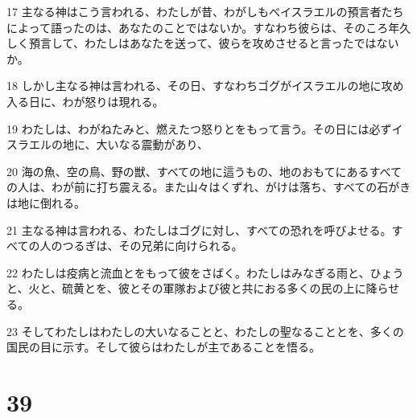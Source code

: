 \par 17 主なる神はこう言われる、わたしが昔、わがしもべイスラエルの預言者たちによって語ったのは、あなたのことではないか。すなわち彼らは、そのころ年久しく預言して、わたしはあなたを送って、彼らを攻めさせると言ったではないか。
\par 18 しかし主なる神は言われる、その日、すなわちゴグがイスラエルの地に攻め入る日に、わが怒りは現れる。
\par 19 わたしは、わがねたみと、燃えたつ怒りとをもって言う。その日には必ずイスラエルの地に、大いなる震動があり、
\par 20 海の魚、空の鳥、野の獣、すべての地に這うもの、地のおもてにあるすべての人は、わが前に打ち震える。また山々はくずれ、がけは落ち、すべての石がきは地に倒れる。
\par 21 主なる神は言われる、わたしはゴグに対し、すべての恐れを呼びよせる。すべての人のつるぎは、その兄弟に向けられる。
\par 22 わたしは疫病と流血とをもって彼をさばく。わたしはみなぎる雨と、ひょうと、火と、硫黄とを、彼とその軍隊および彼と共におる多くの民の上に降らせる。
\par 23 そしてわたしはわたしの大いなることと、わたしの聖なることとを、多くの国民の目に示す。そして彼らはわたしが主であることを悟る。

\chapter{39}

